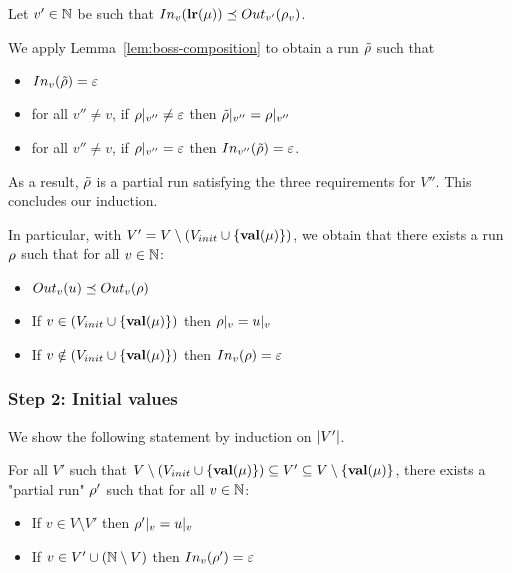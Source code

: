 	Let $v' \in \nats$ be such that $\vinput{v}{\localrunlabel{\node}} \subword \voutput{v'}{\run_v}$. 
	
	We apply Lemma~\ref{lem:boss-composition} to obtain a run $\Tilde{\run}$ such that 
		\begin{itemize}			
		\item $\vinput{v}{\Tilde{\run}} = \varepsilon$ 
		
		\item for all $v'' \neq v$, if $\vproj{v''}{\run} \neq \varepsilon$ then $\vproj{v''}{\Tilde{\run}} = \vproj{v''}{\run}$
		
		\item for all $v'' \neq v$, if $\vproj{v''}{\run} = \varepsilon$ then $\vinput{v''}{\Tilde{\run}} = \varepsilon$.
	\end{itemize}
	
	As a result, $\Tilde{\run}$ is a partial run satisfying the three requirements for $V''$.  This concludes our induction.
	
	In particular, with $V' = V\setminus (V_{init}\cup \set{\valuelabel{\node}})$, we obtain that there exists a run $\run$ such that 
	for all $v \in \nats$:
	\begin{itemize}
		\item $\voutput{v}{u} \subword \voutput{v}{\run}$
		
		\item If $v \in (V_{init}\cup \set{\valuelabel{\node}})$ then $\vproj{v}{\run} = \vproj{v}{u}$
		
		\item If $v \notin (V_{init}\cup \set{\valuelabel{\node}})$ then $\vinput{v}{\run} = \epsilon$
	\end{itemize}  
	
	\subsubsection{Step 2: Initial values}
	\label{sec:tree-to-run-step-two}
	
	We show the following statement by induction on $\size{V'}$.
	
	For all $V'$ such that $V \setminus (V_{init} \cup \set{\valuelabel{\node}}) \subseteq V' \subseteq V \setminus \set{\valuelabel{\node}}$, there exists a "partial run" $\run'$ such that for all $v \in \nats$:
	\begin{itemize}		
		\item If $v \in V \setminus V'$ then $\vproj{v}{\run'} = \vproj{v}{u}$
		
		\item If $v \in V' \cup (\nats \setminus V)$ then $\vinput{v}{\run'} = \epsilon$
	\end{itemize}  

